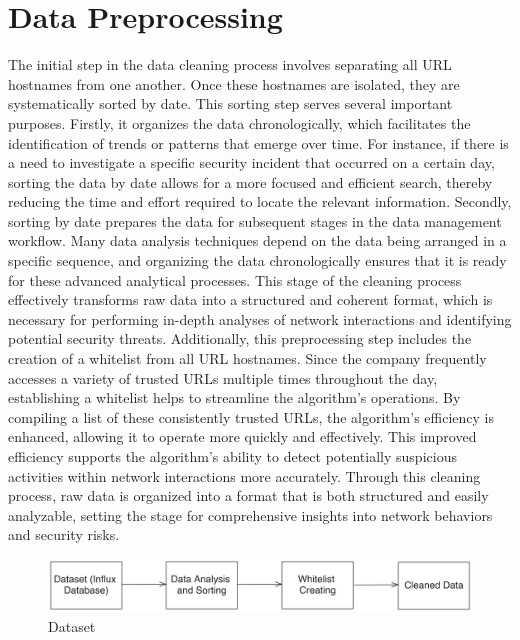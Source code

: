\section{Data Preprocessing}
The initial step in the data cleaning process involves separating all URL hostnames from one another. Once these hostnames are isolated, they are systematically sorted by date. This sorting step serves several important purposes. Firstly, it organizes the data chronologically, which facilitates the identification of trends or patterns that emerge over time. For instance, if there is a need to investigate a specific security incident that occurred on a certain day, sorting the data by date allows for a more focused and efficient search, thereby reducing the time and effort required to locate the relevant information. Secondly, sorting by date prepares the data for subsequent stages in the data management workflow. Many data analysis techniques depend on the data being arranged in a specific sequence, and organizing the data chronologically ensures that it is ready for these advanced analytical processes. This stage of the cleaning process effectively transforms raw data into a structured and coherent format, which is necessary for performing in-depth analyses of network interactions and identifying potential security threats. Additionally, this preprocessing step includes the creation of a whitelist from all URL hostnames. Since the company frequently accesses a variety of trusted URLs multiple times throughout the day, establishing a whitelist helps to streamline the algorithm’s operations. By compiling a list of these consistently trusted URLs, the algorithm's efficiency is enhanced, allowing it to operate more quickly and effectively. This improved efficiency supports the algorithm's ability to detect potentially suspicious activities within network interactions more accurately. Through this cleaning process, raw data is organized into a format that is both structured and easily analyzable, setting the stage for comprehensive insights into network behaviors and security risks.

\begin{figure}
    \centering
    \includegraphics[width=\textwidth]{../Thesis_Docs/media/datasetchart.png}
    \caption{Dataset}
    \label{fig:datasetchart}
\end{figure}

